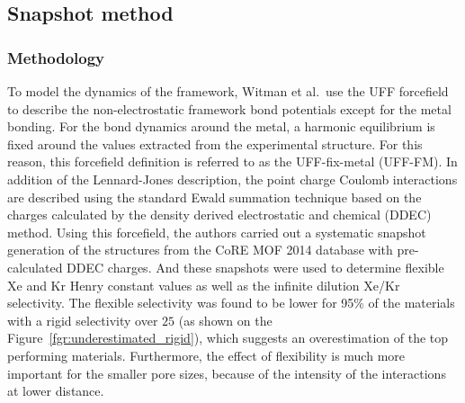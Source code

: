 \documentclass[main]{subfiles}
\begin{document}
\subsection{Snapshot method}

\subsubsection{Methodology}

To model the dynamics of the framework, Witman et al.\ use the UFF forcefield to describe the non-electrostatic framework bond potentials except for the metal bonding. For the bond dynamics around the metal, a harmonic equilibrium is fixed around the values extracted from the experimental structure. For this reason, this forcefield definition is referred to as the UFF-fix-metal (UFF-FM). In addition of the Lennard-Jones description, the point charge Coulomb interactions are described using the standard Ewald summation technique based on the charges calculated by the density derived electrostatic and chemical (DDEC) method.\autocite{manz2010chemically} Using this forcefield, the authors carried out a systematic snapshot generation of the structures from the CoRE MOF 2014 database with pre-calculated DDEC charges. And these snapshots were used to determine flexible Xe and Kr Henry constant values as well as the infinite dilution Xe/Kr selectivity. The flexible selectivity was found to be lower for {95\%} of the materials with a rigid selectivity over $25$ (as shown on the Figure~\ref{fgr:underestimated_rigid}), which suggests an overestimation of the top performing materials. Furthermore, the effect of flexibility is much more important for the smaller pore sizes, because of the intensity of the interactions at lower distance. 
\end{document}
